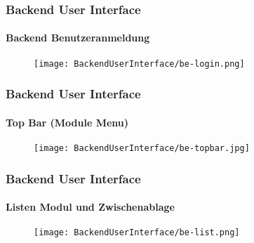 
\begin{frame}[fragile]
	\frametitle{Backend User Interface}
	\framesubtitle{Backend Benutzeranmeldung}

	\begin{figure}
		\texttt{[image: BackendUserInterface/be-login.png]}
	\end{figure}

\end{frame}


\begin{frame}[fragile]
	\frametitle{Backend User Interface}
	\framesubtitle{Top Bar (Module Menu)}

	\begin{figure}
		\texttt{[image: BackendUserInterface/be-topbar.jpg]}
	\end{figure}

\end{frame}


\begin{frame}[fragile]
	\frametitle{Backend User Interface}
	\framesubtitle{Listen Modul und Zwischenablage}

	\begin{figure}
		\texttt{[image: BackendUserInterface/be-list.png]}
	\end{figure}

\end{frame}

